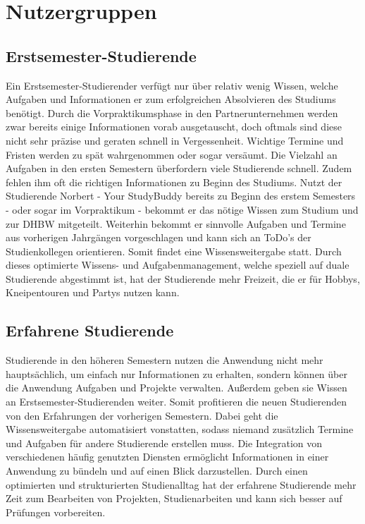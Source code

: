 \section{Nutzergruppen}

\subsection{Erstsemester-Studierende}
Ein Erstsemester-Studierender verfügt nur über relativ wenig Wissen, welche Aufgaben und Informationen er zum erfolgreichen Absolvieren des Studiums benötigt. Durch die Vorpraktikumsphase in den Partnerunternehmen werden zwar bereits einige Informationen vorab ausgetauscht, doch oftmals sind diese nicht sehr präzise und geraten schnell in Vergessenheit. Wichtige Termine und Fristen werden zu spät wahrgenommen oder sogar versäumt. Die Vielzahl an Aufgaben in den ersten Semestern überfordern viele Studierende schnell. Zudem fehlen ihm oft die richtigen Informationen zu Beginn des Studiums. Nutzt der Studierende Norbert - Your StudyBuddy bereits zu Beginn des erstem Semesters - oder sogar im Vorpraktikum - bekommt er  das nötige Wissen zum Studium und zur DHBW mitgeteilt. Weiterhin bekommt er sinnvolle Aufgaben und Termine aus vorherigen Jahrgängen vorgeschlagen und kann sich an ToDo's der Studienkollegen orientieren. Somit findet eine Wissensweitergabe statt. Durch dieses optimierte Wissens- und Aufgabenmanagement, welche speziell auf duale Studierende abgestimmt ist, hat der Studierende mehr Freizeit, die er für Hobbys, Kneipentouren und Partys nutzen kann.

\subsection{Erfahrene Studierende}
Studierende in den höheren Semestern nutzen die Anwendung nicht mehr hauptsächlich, um einfach nur Informationen zu erhalten, sondern können über die Anwendung Aufgaben und Projekte verwalten. Außerdem geben sie Wissen an Erstsemester-Studierenden weiter. Somit profitieren die neuen Studierenden von den Erfahrungen  der vorherigen Semestern. Dabei geht die Wissensweitergabe automatisiert vonstatten, sodass niemand zusätzlich Termine und Aufgaben für andere Studierende erstellen muss. Die Integration von verschiedenen häufig genutzten Diensten ermöglicht Informationen in einer Anwendung zu bündeln und auf einen Blick darzustellen. Durch einen optimierten und strukturierten Studienalltag hat der erfahrene Studierende mehr Zeit zum Bearbeiten von Projekten, Studienarbeiten und kann sich besser auf Prüfungen vorbereiten.
